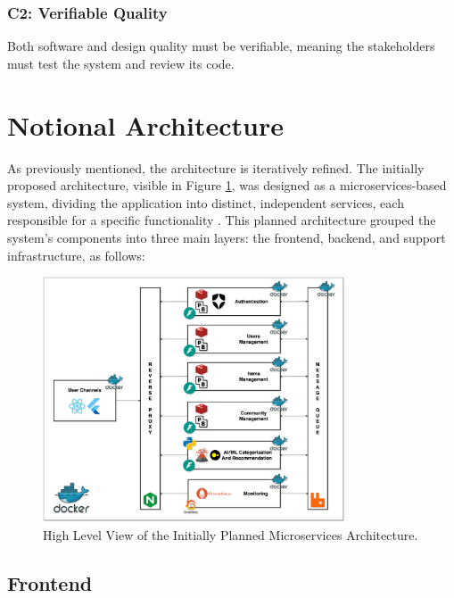 \subsubsection{C2: Verifiable Quality}

Both software and design quality must be verifiable, meaning the stakeholders must test the system and review its code.


\section{Notional Architecture} \label{section:notional_architecture}

As previously mentioned, the architecture is iteratively refined. The initially proposed architecture, visible in Figure \ref{fig:initial_arch}, was designed as a microservices-based system, dividing the application into distinct, independent services, each responsible for a specific functionality \cite{Al-Debagy2021,Söylemez2024}. This planned architecture grouped the system's components into three main layers: the frontend, backend, and support infrastructure, as follows:

\begin{figure}[!htb]
    \includegraphics[width=0.8\textwidth]{figs/chapter3/initial_arch.png}
    \centering
    \caption[Initial Microservices Architecture]{High Level View of the Initially Planned Microservices Architecture.}
    \label{fig:initial_arch}
\end{figure}

\subsection{Frontend}

